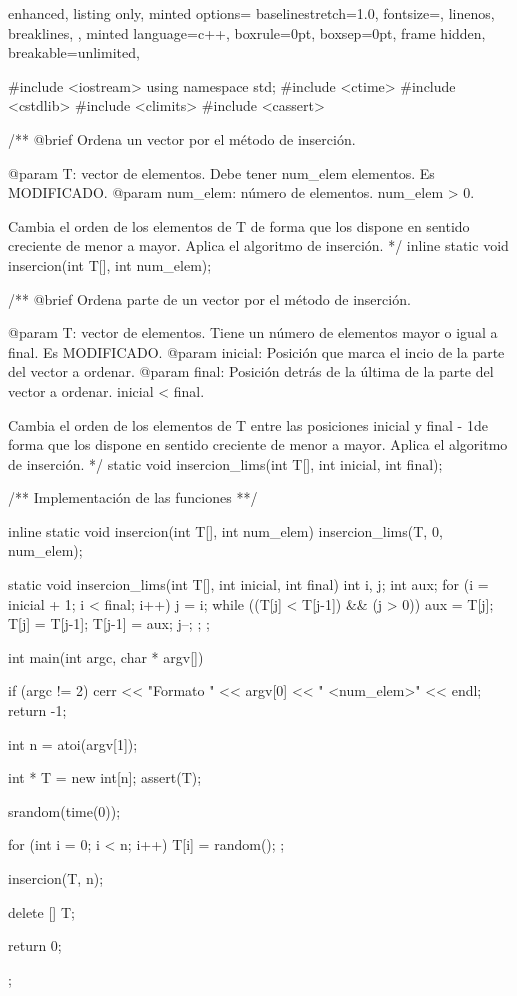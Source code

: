 \documentclass[12pt,spanish]{article}
\begin{document}
\begin{multicols}{2}
\begin{tcblisting}
{
  enhanced,
  listing only,
  minted options={
    baselinestretch=1.0,
    fontsize=\footnotesize,
    linenos,
    breaklines,
  },
  minted language=c++,
  boxrule=0pt,
  boxsep=0pt,
  frame hidden,
  breakable=unlimited,
}

#include <iostream>
using namespace std;
#include <ctime>
#include <cstdlib>
#include <climits>
#include <cassert>

/**
   @brief Ordena un vector por el método de inserción.

   @param T: vector de elementos. Debe tener num_elem elementos.
             Es MODIFICADO.
   @param num_elem: número de elementos. num_elem > 0.

   Cambia el orden de los elementos de T de forma que los dispone
   en sentido creciente de menor a mayor.
   Aplica el algoritmo de inserción.
*/
inline static 
void insercion(int T[], int num_elem);

/**
   @brief Ordena parte de un vector por el método de inserción.

   @param T: vector de elementos. Tiene un número de elementos 
                   mayor o igual a final. Es MODIFICADO.
   @param inicial: Posición que marca el incio de la parte del
                   vector a ordenar.
   @param final: Posición detrás de la última de la parte del
                   vector a ordenar. 
		   inicial < final.

   Cambia el orden de los elementos de T entre las posiciones
   inicial y final - 1de forma que los dispone en sentido creciente
   de menor a mayor.
   Aplica el algoritmo de inserción.
*/
static void insercion_lims(int T[], int inicial, int final);

/**
   Implementación de las funciones
**/

inline static void insercion(int T[], int num_elem)
{
  insercion_lims(T, 0, num_elem);
}

static void insercion_lims(int T[], int inicial, int final)
{
  int i, j;
  int aux;
  for (i = inicial + 1; i < final; i++) {
    j = i;
    while ((T[j] < T[j-1]) && (j > 0)) {
      aux = T[j];
      T[j] = T[j-1];
      T[j-1] = aux;
      j--;
    };
  };
}

int main(int argc, char * argv[])
{
  
    if (argc != 2)
    {
      cerr << "Formato " << argv[0] << " <num_elem>" << endl;
      return -1;
    }

  int n = atoi(argv[1]);

  int * T = new int[n];
  assert(T);

  srandom(time(0));

  for (int i = 0; i < n; i++)
    {
      T[i] = random();
    };

  insercion(T, n);

  delete [] T;

  return 0;
};
 
\end{tcblisting}
\end{multicols}
\newpage
\end{document}
